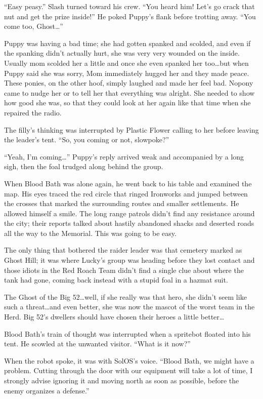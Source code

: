 ``Easy peasy.'' Slash turned toward his crew. ``You heard him! Let's go crack that nut and get the prize inside!'' He poked Puppy's flank before trotting away. ``You come too, Ghost\dots''

Puppy was having a bad time; she had gotten spanked and scolded, and even if the spanking didn't actually hurt, she was very very wounded on the inside. Usually mom scolded her a little and once she even spanked her too\dots but when Puppy said she was sorry, Mom immediately hugged her and they made peace. These ponies, on the other hoof, simply laughed and made her feel bad. Nopony came to nudge her or to tell her that everything was alright. She needed to show how good she was, so that they could look at her again like that time when she repaired the radio.

The filly's thinking was interrupted by Plastic Flower calling to her before leaving the leader's tent. ``So, you coming or not, slowpoke?''

``Yeah, I'm coming\dots'' Puppy's reply arrived weak and accompanied by a long sigh, then the foal trudged along behind the group.

When Blood Bath was alone again, he went back to his table and examined the map. His eyes traced the red circle that ringed Ironworks and jumped between the crosses that marked the surrounding routes and smaller settlements. He allowed himself a smile. The long range patrols didn't find any resistance around the city; their reports talked about hastily abandoned shacks and deserted roads all the way to the Memorial. This was going to be easy.

The only thing that bothered the raider leader was that cemetery marked as Ghost Hill; it was where Lucky's group was heading before they lost contact and those idiots in the Red Roach Team didn't find a single clue about where the tank had gone, coming back instead with a stupid foal in a hazmat suit.

The Ghost of the Big 52\dots well, if she really was that hero, she didn't seem like such a threat\dots and even better, she was now the mascot of the worst team in the Herd. Big 52's dwellers should have chosen their heroes a little better\dots

Blood Bath's train of thought was interrupted when a spritebot floated into his tent. He scowled at the unwanted visitor. ``What is it now?''

When the robot spoke, it was with SolOS's voice. ``Blood Bath, we might have a problem. Cutting through the door with our equipment will take a lot of time, I strongly advise ignoring it and moving north as soon as possible, before the enemy organizes a defense.''

